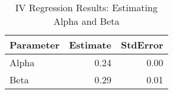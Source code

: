 \begin{table}[ht]
\centering
\begin{tabular}{lrr}
  \hline
Parameter & Estimate & StdError \\ 
  \hline
Alpha & 0.24 & 0.00 \\ 
  Beta & 0.29 & 0.01 \\ 
   \hline
\end{tabular}
\caption{IV Regression Results: Estimating Alpha and Beta} 
\label{tab:iv_results}
\end{table}
